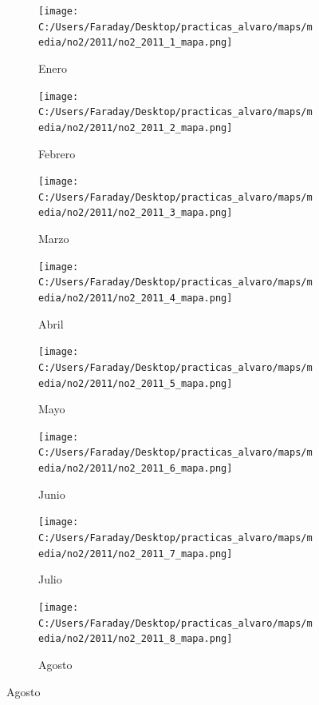 \documentclass[12pt]{beamer}
\begin{document}
\begin{frame}[squeeze]
\tiny
\begin{figure}[H]
\centering
\begin{subfigure}[H]{0.20\textwidth}
\texttt{[image: C:/Users/Faraday/Desktop/practicas\_alvaro/maps/media/no2/2011/no2\_2011\_1\_mapa.png]}
\captionsetup{labelformat=empty}
\caption{\scriptsize Enero}
\label{fig:map-no2-2011-1}
\end{subfigure}
%
\begin{subfigure}[H]{0.20\textwidth}
\texttt{[image: C:/Users/Faraday/Desktop/practicas\_alvaro/maps/media/no2/2011/no2\_2011\_2\_mapa.png]}
\captionsetup{labelformat=empty}
\caption{\scriptsize Febrero}
\label{fig:map-no2-2011-2}
\end{subfigure}
%
\begin{subfigure}[H]{0.20\textwidth}
\texttt{[image: C:/Users/Faraday/Desktop/practicas\_alvaro/maps/media/no2/2011/no2\_2011\_3\_mapa.png]}
\captionsetup{labelformat=empty}
\caption{\scriptsize Marzo}
\label{fig:map-no2-2011-3}
\end{subfigure}
%
\begin{subfigure}[H]{0.20\textwidth}
\texttt{[image: C:/Users/Faraday/Desktop/practicas\_alvaro/maps/media/no2/2011/no2\_2011\_4\_mapa.png]}
\captionsetup{labelformat=empty}
\caption{\scriptsize Abril}
\label{fig:map-no2-2011-4}
\end{subfigure}

\begin{subfigure}[H]{0.20\textwidth}
\texttt{[image: C:/Users/Faraday/Desktop/practicas\_alvaro/maps/media/no2/2011/no2\_2011\_5\_mapa.png]}
\captionsetup{labelformat=empty}
\caption{\scriptsize Mayo}
\label{fig:map-no2-2011-5}
\end{subfigure}
%
\begin{subfigure}[H]{0.20\textwidth}
\texttt{[image: C:/Users/Faraday/Desktop/practicas\_alvaro/maps/media/no2/2011/no2\_2011\_6\_mapa.png]}
\captionsetup{labelformat=empty}
\caption{\scriptsize Junio}
\label{fig:map-no2-2011-6}
\end{subfigure}
%
\begin{subfigure}[H]{0.20\textwidth}
\texttt{[image: C:/Users/Faraday/Desktop/practicas\_alvaro/maps/media/no2/2011/no2\_2011\_7\_mapa.png]}
\captionsetup{labelformat=empty}
\caption{\scriptsize Julio}
\label{fig:map-no2-2011-7}
\end{subfigure}
%
\begin{subfigure}[H]{0.20\textwidth}
\texttt{[image: C:/Users/Faraday/Desktop/practicas\_alvaro/maps/media/no2/2011/no2\_2011\_8\_mapa.png]}
\captionsetup{labelformat=empty}
\caption{\scriptsize Agosto}
\label{fig:map-no2-2011-8}
\end{subfigure}


\end{figure}
\end{frame}
\end{document}
